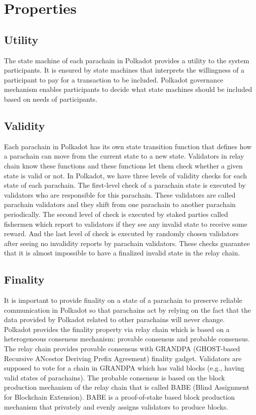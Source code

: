 \section{Properties}\label{sec:properties}

 \subsection{Utility}

 The state machine of each parachain in Polkadot provides a utility to the system participants. It is ensured by state machines that interprets the willingness of a participant to pay for a transaction to be included.  Polkadot governance mechanism enables participants to decide what state machines should be included based on needs of participants.



 \subsection{Validity}
Each parachain in Polkadot has its own state transition function that defines how a parachain can move from the current state to a new state.   Validators in relay chain  know these functions and these functions let them  check whether a given state is valid or not.  In Polkadot, we have three levels of validity checks for each state of each parachain. The first-level check of a parachain state is executed by validators who are responsible for this parachain. These validators are called parachain validators and they shift from one parachain to another parachain periodically. The second level of check is executed by staked parties called fishermen which report to validators if they see any invalid state to receive some reward. And the last level of check is executed by randomly chosen validators after seeing no invalidity reports by parachain validators. These checks guarantee that it is almost impossible to have a finalized invalid state in the relay chain.

 \subsection{Finality}

 It is important to provide finality on a state of a parachain to preserve reliable communication in Polkadot so that parachains act by relying on the fact that the data provided by Polkadot related to other parachains will never change.  Polkadot provides the finality property via relay chain which is based on a heterogeneous consensus mechanism: provable consensus and probable consensus. The relay chain provides provable consensus with GRANDPA (GHOST-based Recursive ANcestor Deriving Prefix Agreement)  finality gadget. Validators are supposed to vote for a chain in GRANDPA  which has valid blocks (e.g., having valid states of parachains). The probable consensus is based on the block production mechanism of the relay chain that is called BABE (Blind Assignment for Blockchain Extension). BABE is a proof-of-stake based block production mechanism that privately and evenly assigns validators to produce blocks.

